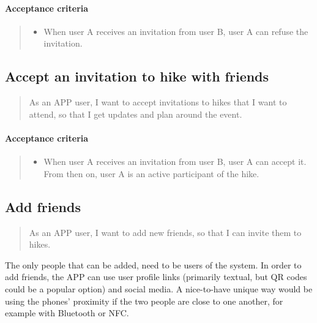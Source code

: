 \paragraph*{Acceptance criteria}
\begin{quote}
\begin{itemize}
    \item When user A receives an invitation from user B, user A can refuse the invitation.
\end{itemize}
\end{quote}

\subsection{Accept an invitation to hike with friends}\label{US:friends-invite-accept}
\begin{quote}
As an APP user, I want to accept invitations to hikes that I want to attend, so that I get updates and plan around the event.
\end{quote}

\paragraph*{Acceptance criteria}
\begin{quote}
\begin{itemize}
    \item When user A receives an invitation from user B, user A can accept it. From then on, user A is an active participant of the hike.
\end{itemize}
\end{quote}


\subsection{Add friends}\label{US:friends-add}
\begin{quote}
As an APP user, I want to add new friends, so that I can invite them to hikes.
\end{quote}

The only people that can be added, need to be users of the system.
In order to add friends, the APP can use user profile links (primarily textual, but QR codes could be a popular option) and social media.
A nice-to-have unique way would be using the phones' proximity if the two people are close to one another, for example with Bluetooth or NFC.


